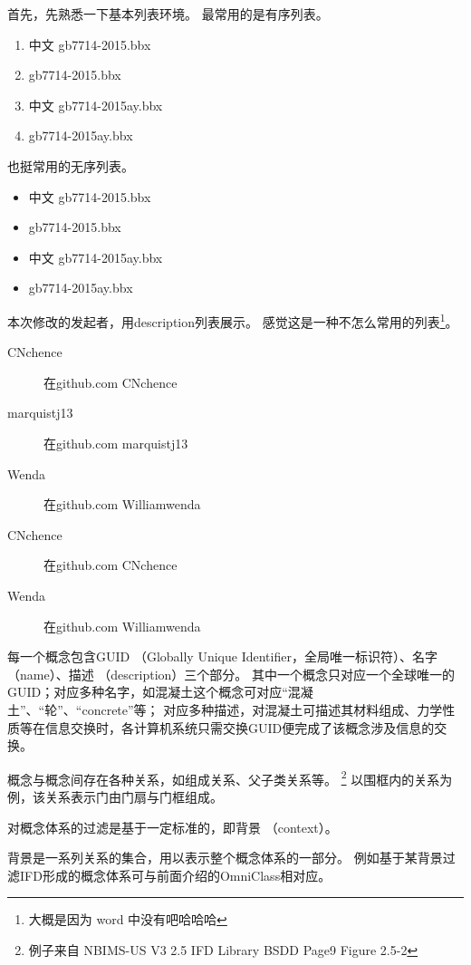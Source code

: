 \documentclass[../Main/thesis]{subfiles}
\begin{document}
首先，先熟悉一下基本列表环境。
最常用的是有序列表。

\begin{enumerate}
  \item 中文 gb7714-2015.bbx
  \item gb7714-2015.bbx
  \item 中文 gb7714-2015ay.bbx
  \item gb7714-2015ay.bbx
\end{enumerate}

也挺常用的无序列表。

\begin{itemize}
  \item 中文 gb7714-2015.bbx
  \item gb7714-2015.bbx
  \item 中文 gb7714-2015ay.bbx
  \item gb7714-2015ay.bbx
\end{itemize}

本次修改的发起者，用description列表展示。
感觉这是一种不怎么常用的列表\footnote{大概是因为 word 中没有吧哈哈哈}。

\begin{description}
  \item[CNchence] 在github.com CNchence
  \item[marquistj13] 在github.com marquistj13
  \item[Wenda] 在github.com Williamwenda
  \item[CNchence] 在github.com CNchence
  \item[Wenda] 在github.com Williamwenda
\end{description}

\begin{description}[style=nextline]

  \item[概念 concept] 每一个概念包含GUID （Globally Unique Identifier，全局唯一标识符）、名字 （name）、描述 （description）三个部分。
  其中一个概念只对应一个全球唯一的GUID；对应多种名字，如混凝土这个概念可对应“混凝土”、“轮”、“concrete”等；
  对应多种描述，对混凝土可描述其材料组成、力学性质等在信息交换时，各计算机系统只需交换GUID便完成了该概念涉及信息的交换。

  \item[关系 （relationship）] 概念与概念间存在各种关系，如组成关系、父子类关系等。
    \footnote{例子来自 NBIMS-US V3 2.5 IFD Library BSDD Page9 Figure 2.5-2}
  以围框内的关系为例，该关系表示门由门扇与门框组成。

  \item[过滤 （filtering）] 对概念体系的过滤是基于一定标准的，即背景 （context）。

  背景是一系列关系的集合，用以表示整个概念体系的一部分。
  例如基于某背景过滤IFD形成的概念体系可与前面介绍的OmniClass相对应。

\end{description}
\end{document}
